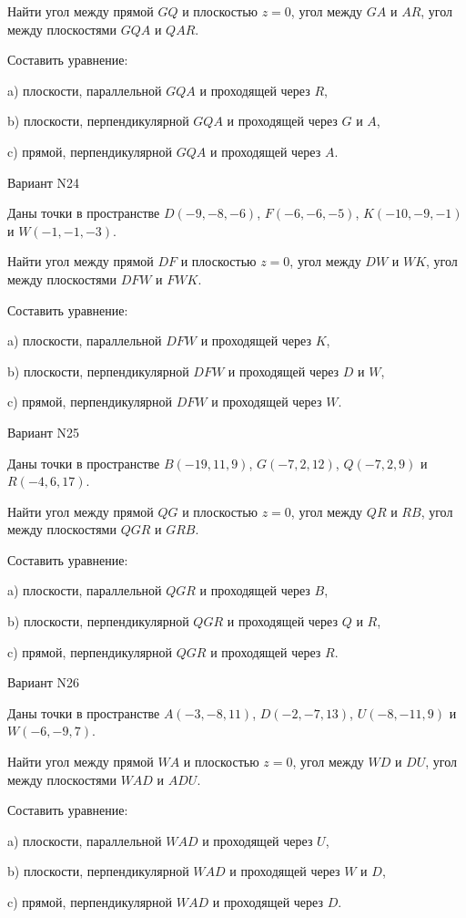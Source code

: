 \documentclass[11pt]{report}
\begin{document}
Найти угол между прямой $GQ$ и плоскостью $z = 0$, угол между $GA$ и $AR$, угол между плоскостями $GQA$ 
и $QAR$.

Составить уравнение: 

a) плоскости, параллельной $GQA$ и проходящей через $R$,

b) плоскости, перпендикулярной $GQA$ и проходящей через $G$ и $A$,

c) прямой, перпендикулярной $GQA$ и проходящей через $A$.

Вариант N24

Даны точки в пространстве
$D(-9, -8, -6)$, $F(-6, -6, -5)$, $K(-10, -9, -1)$ и
$W(-1, -1, -3)$.

Найти угол между прямой $DF$ и плоскостью $z = 0$, угол между $DW$ и $WK$, угол между плоскостями $DFW$ 
и $FWK$.

Составить уравнение: 

a) плоскости, параллельной $DFW$ и проходящей через $K$,

b) плоскости, перпендикулярной $DFW$ и проходящей через $D$ и $W$,

c) прямой, перпендикулярной $DFW$ и проходящей через $W$.

Вариант N25

Даны точки в пространстве
$B(-19, 11, 9)$, $G(-7, 2, 12)$, $Q(-7, 2, 9)$ и
$R(-4, 6, 17)$.

Найти угол между прямой $QG$ и плоскостью $z = 0$, угол между $QR$ и $RB$, угол между плоскостями $QGR$ 
и $GRB$.

Составить уравнение: 

a) плоскости, параллельной $QGR$ и проходящей через $B$,

b) плоскости, перпендикулярной $QGR$ и проходящей через $Q$ и $R$,

c) прямой, перпендикулярной $QGR$ и проходящей через $R$.

Вариант N26

Даны точки в пространстве
$A(-3, -8, 11)$, $D(-2, -7, 13)$, $U(-8, -11, 9)$ и
$W(-6, -9, 7)$.

Найти угол между прямой $WA$ и плоскостью $z = 0$, угол между $WD$ и $DU$, угол между плоскостями $WAD$ 
и $ADU$.

Составить уравнение: 

a) плоскости, параллельной $WAD$ и проходящей через $U$,

b) плоскости, перпендикулярной $WAD$ и проходящей через $W$ и $D$,

c) прямой, перпендикулярной $WAD$ и проходящей через $D$.
\end{document}
